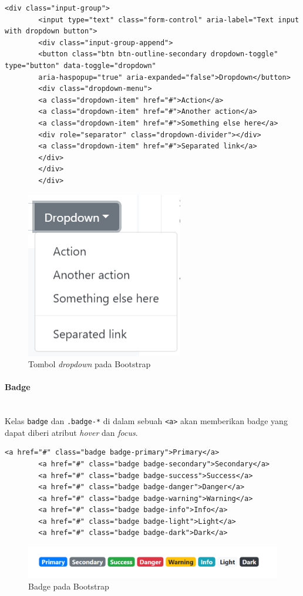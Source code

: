 \documentclass[a4paper,twoside]{article}
\newcommand{\myparagraph}[1]{\paragraph{#1}\mbox{}\\}
\begin{document}
\begin{enumerate}
\begin{lstlisting}[frame=single, basicstyle=\tiny]
		<div class="input-group">
		<input type="text" class="form-control" aria-label="Text input with dropdown button">
		<div class="input-group-append">
		<button class="btn btn-outline-secondary dropdown-toggle" type="button" data-toggle="dropdown"
		aria-haspopup="true" aria-expanded="false">Dropdown</button>
		<div class="dropdown-menu">
		<a class="dropdown-item" href="#">Action</a>
		<a class="dropdown-item" href="#">Another action</a>
		<a class="dropdown-item" href="#">Something else here</a>
		<div role="separator" class="dropdown-divider"></div>
		<a class="dropdown-item" href="#">Separated link</a>
		</div>
		</div>
		</div>
		\end{lstlisting}
		
		\begin{figure} [H]
			\centering  
			\includegraphics[scale=1.0]{buttonsdropdown_bootstrap.PNG}  
			\caption{Tombol \textit{dropdown} pada Bootstrap} 
		\end{figure}
		
		\myparagraph{Badge}
		Kelas \colorbox{mygray}{\texttt{badge}} dan \colorbox{mygray}{\texttt{.badge-*}} di dalam sebuah \colorbox{mygray}{\texttt{<a>}} akan memberikan badge yang dapat diberi atribut \textit{hover} dan \textit{focus}. 
		\begin{lstlisting}[frame=single, basicstyle=\tiny]
		<a href="#" class="badge badge-primary">Primary</a>
		<a href="#" class="badge badge-secondary">Secondary</a>
		<a href="#" class="badge badge-success">Success</a>
		<a href="#" class="badge badge-danger">Danger</a>
		<a href="#" class="badge badge-warning">Warning</a>
		<a href="#" class="badge badge-info">Info</a>
		<a href="#" class="badge badge-light">Light</a>
		<a href="#" class="badge badge-dark">Dark</a>
		\end{lstlisting}
		
		\begin{figure} [H]
			\centering  
			\includegraphics[scale=1.0]{badge_bootstrap.PNG}  
			\caption{Badge pada Bootstrap} 
		\end{figure}
		

\end{enumerate}
\end{document}
